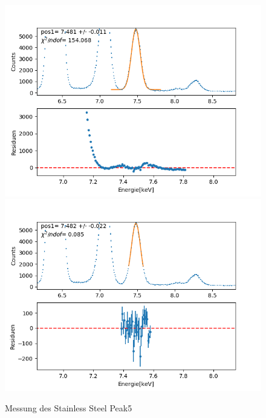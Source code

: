 \documentclass[12pt,a4paper]{article}
\begin{document}
\begin{figure}[H]
\centering
\includegraphics[scale=0.49]{Bilder/roentgen_spektren/stahl/rub5_1.png}
\includegraphics[scale=0.49]{Bilder/roentgen_spektren/stahl/rub5_2.png}
\caption{Messung des Stainless Steel Peak5}
\end{figure}
\end{document}
